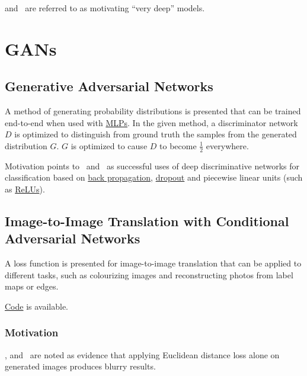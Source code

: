 \documentclass[a4paper, 12pt]{article}
\begin{document}
\cite{going-deeper-szegedy43022} and~\cite{DBLP:journals/corr/SimonyanZ14a} are
referred to as motivating ``very deep'' models.


\section{GANs}

\subsection{Generative Adversarial Networks\cite{NIPS2014_5423}}
\label{gan}

A method of generating probability distributions is presented that can be
trained end-to-end when used with \hyperref[multilayer_perceptron]{MLPs}. In
the given method, a discriminator network $D$ is optimized to distinguish from
ground truth the samples from the generated distribution $G$. $G$ is optimized
to cause $D$ to become $\frac{1}{2}$ everywhere.

Motivation points to~\cite{deepSpeechReviewSPM2012} and~\cite{NIPS2012_4824} as
successful uses of deep discriminative networks for classification based on
\hyperref[backprop]{back propagation}, \hyperref[dropout]{dropout} and
piecewise linear units (such as \hyperref[rectified_linear_units]{ReLUs}).

\subsection{Image-to-Image Translation with Conditional Adversarial
            Networks\cite{DBLP:journals/corr/IsolaZZE16}}

A loss function is presented for image-to-image translation that can be applied
to different tasks, such as colourizing images and reconstructing photos from
label maps or edges.

\href{https://github.com/phillipi/pix2pix}{Code} is available.

\subsubsection{Motivation}

\cite{DBLP:journals/corr/LarsenSW15}, \cite{DBLP:journals/corr/PathakKDDE16}
and~\cite{DBLP:journals/corr/ZhangIE16} are noted as evidence that applying
Euclidean distance loss alone on generated images produces blurry results.
\end{document}
